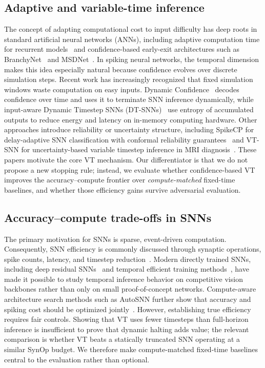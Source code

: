 \documentclass[11pt]{article}
\begin{document}
\subsection{Adaptive and variable-time inference}
The concept of adapting computational cost to input difficulty has deep roots in standard artificial neural networks (ANNs), including adaptive computation time for recurrent models~\cite{graves2016adaptive} and confidence-based early-exit architectures such as BranchyNet~\cite{teerapittayanon2016branchynet} and MSDNet~\cite{huang2018msdnet}. In spiking neural networks, the temporal dimension makes this idea especially natural because confidence evolves over discrete simulation steps. Recent work has increasingly recognized that fixed simulation windows waste computation on easy inputs. Dynamic Confidence~\cite{li2023dynamicconfidence} decodes confidence over time and uses it to terminate SNN inference dynamically, while input-aware Dynamic Timestep SNNs (DT-SNNs)~\cite{li2023dtsnn} use entropy of accumulated outputs to reduce energy and latency on in-memory computing hardware. Other approaches introduce reliability or uncertainty structure, including SpikeCP for delay-adaptive SNN classification with conformal reliability guarantees~\cite{chen2024spikecp} and VT-SNN for uncertainty-based variable timestep inference in MRI diagnosis~\cite{rao2025vtsnn}. These papers motivate the core VT mechanism. Our differentiator is that we do not propose a new stopping rule; instead, we evaluate whether confidence-based VT improves the accuracy--compute frontier over \emph{compute-matched} fixed-time baselines, and whether those efficiency gains survive adversarial evaluation.

\subsection{Accuracy--compute trade-offs in SNNs}
The primary motivation for SNNs is sparse, event-driven computation. Consequently, SNN efficiency is commonly discussed through synaptic operations, spike counts, latency, and timestep reduction~\cite{rueckauer2017conversion,sorbaro2020energy}. Modern directly trained SNNs, including deep residual SNNs~\cite{fang2021sewresnet} and temporal efficient training methods~\cite{deng2022tet}, have made it possible to study temporal inference behavior on competitive vision backbones rather than only on small proof-of-concept networks. Compute-aware architecture search methods such as AutoSNN further show that accuracy and spiking cost should be optimized jointly~\cite{na2022autosnn}. However, establishing true efficiency requires fair controls. Showing that VT uses fewer timesteps than full-horizon inference is insufficient to prove that dynamic halting adds value; the relevant comparison is whether VT beats a statically truncated SNN operating at a similar SynOp budget. We therefore make compute-matched fixed-time baselines central to the evaluation rather than optional.
\end{document}
